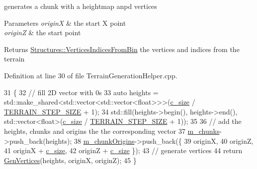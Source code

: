 generates a chunk with a heightmap anpd vertices 


\begin{DoxyParams}{Parameters}
{\em originX} & the start X point \\
\hline
{\em originZ} & the start point \\
\hline
\end{DoxyParams}
\begin{DoxyReturn}{Returns}
\mbox{\hyperlink{struct_structures_1_1_vertices_indices_from_bin}{Structures\+::\+Vertices\+Indices\+From\+Bin}} the vertices and indices from the terrain 
\end{DoxyReturn}


Definition at line 30 of file Terrain\+Generation\+Helper.\+cpp.


\begin{DoxyCode}
31 \{
32     \textcolor{comment}{// fill 2D vector with 0s }
33     \textcolor{keyword}{auto} heights = std::make\_shared<std::vector<std::vector<float>>>(\mbox{\hyperlink{class_terrain_generation_helper_a2e182f64a684cc0cf248f2f940cc36dc}{c\_size}} / 
      \mbox{\hyperlink{_terrain_generation_helper_8h_ad04a251ab3e1323474688977de1579e4}{TERRAIN\_STEP\_SIZE}} + 1);
34     std::fill(heights->begin(), heights->end(), std::vector<float>(\mbox{\hyperlink{class_terrain_generation_helper_a2e182f64a684cc0cf248f2f940cc36dc}{c\_size}} / 
      \mbox{\hyperlink{_terrain_generation_helper_8h_ad04a251ab3e1323474688977de1579e4}{TERRAIN\_STEP\_SIZE}} + 1));
35 
36     \textcolor{comment}{// add the heights, chunks and origins the the corresponding vector}
37     \mbox{\hyperlink{class_terrain_generation_helper_ab5a4b915382e685454f5fe7f6081bc08}{m\_chunks}}->push\_back(heights);
38     \mbox{\hyperlink{class_terrain_generation_helper_a54b02e81523e592c5f36646731cd5a68}{m\_chunkOrigins}}->push\_back(\{ 
39         originX,
40         originZ,
41         originX + \mbox{\hyperlink{class_terrain_generation_helper_a2e182f64a684cc0cf248f2f940cc36dc}{c\_size}},
42         originZ + \mbox{\hyperlink{class_terrain_generation_helper_a2e182f64a684cc0cf248f2f940cc36dc}{c\_size}} \});
43     \textcolor{comment}{// generate vertices}
44     \textcolor{keywordflow}{return} \mbox{\hyperlink{class_terrain_generation_helper_a2c7c7834ad5c8d4d4523931fbbc2f981}{GenVertices}}(heights, originX, originZ);
45 \}
\end{DoxyCode}
\mbox{\label{class_terrain_generation_helper_a3ef70fded2f8984224915ec14c1238a7}} 
